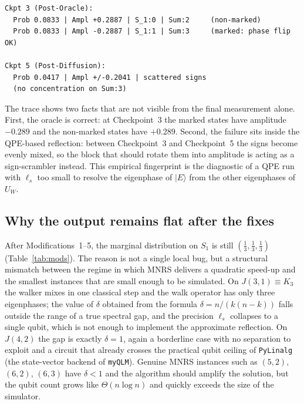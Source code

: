 \documentclass[11pt,a4paper]{article}
\begin{document}
\begin{lstlisting}[style=plain]
Ckpt 3 (Post-Oracle):
  Prob 0.0833 | Ampl +0.2887 | S_1:0 | Sum:2     (non-marked)
  Prob 0.0833 | Ampl -0.2887 | S_1:1 | Sum:3     (marked: phase flip OK)

Ckpt 5 (Post-Diffusion):
  Prob 0.0417 | Ampl +/-0.2041 | scattered signs
  (no concentration on Sum:3)
\end{lstlisting}

The trace shows two facts that are not visible from the final
measurement alone. First, the oracle is correct: at Checkpoint~3
the marked states have amplitude $-0.289$ and the non-marked
states have $+0.289$. Second, the failure sits inside the
QPE-based reflection: between Checkpoint~3 and Checkpoint~5 the
signs become evenly mixed, so the block that should rotate them
into amplitude is acting as a sign-scrambler instead. This
empirical fingerprint is the diagnostic of a QPE run with
$\ell_s$ too small to resolve the eigenphase of $|E\rangle$ from
the other eigenphases of $U_W$.

\subsection{Why the output remains flat after the fixes}

After Modifications~1--5, the marginal distribution on $S_1$ is
still $(\tfrac13,\tfrac13,\tfrac13)$ (Table~\ref{tab:mods}). The reason is not a single
local bug, but a structural mismatch between the regime in which
MNRS delivers a quadratic speed-up and the smallest instances that
are small enough to be simulated. On $J(3,1) \equiv K_3$ the
walker mixes in one classical step and the walk operator has
only three eigenphases; the value of $\delta$ obtained from the
formula $\delta = n/(k(n-k))$ falls outside the range of
a true spectral gap, and the precision $\ell_s$ collapses to a
single qubit, which is not enough to implement the approximate
reflection. On $J(4,2)$ the gap is exactly $\delta = 1$, again a
borderline case with no separation to exploit and a circuit that
already crosses the practical qubit ceiling of \texttt{PyLinalg} (the state-vector backend of \texttt{myQLM}).
Genuine MNRS instances such as $(5,2)$, $(6,2)$, $(6,3)$ have
$\delta < 1$ and the algorithm should amplify the solution, but
the qubit count grows like $\Theta(n \log n)$ and quickly exceeds
the size of the simulator.
\end{document}
